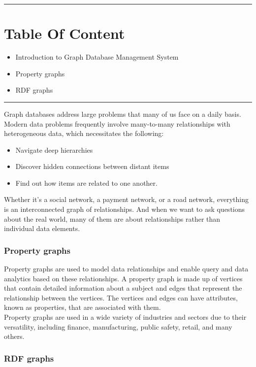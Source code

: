 \documentclass[12pt,a4paper]{article}
\begin{document}
\rule{\textwidth}{1pt}
  \section* {Table Of Content}
  \begin{itemize}
    \item Introduction to Graph Database Management System
    \item Property graphs
    \item RDF graphs
  \end{itemize}

  \rule{\textwidth}{1pt}
  
\pagebreak

Graph databases address large problems that many of us face on a daily basis. Modern data problems frequently involve many-to-many relationships with heterogeneous data, which necessitates the following:
\begin{itemize}
    \item Navigate deep hierarchies
    \item Discover hidden connections between distant items
    \item Find out how items are related to one another.
  \end{itemize}
Whether it's a social network, a payment network, or a road network, everything is an interconnected graph of relationships. And when we want to ask questions about the real world, many of them are about relationships rather than individual data elements.
\pagebreak

\subsubsection*{Property graphs}
Property graphs are used to model data relationships and enable query and data analytics based on these relationships. A property graph is made up of vertices that contain detailed information about a subject and edges that represent the relationship between the vertices. The vertices and edges can have attributes, known as properties, that are associated with them.
\\
Property graphs are used in a wide variety of industries and sectors due to their versatility, including finance, manufacturing, public safety, retail, and many others.
\pagebreak

\subsubsection*{RDF graphs}
\end{document}
